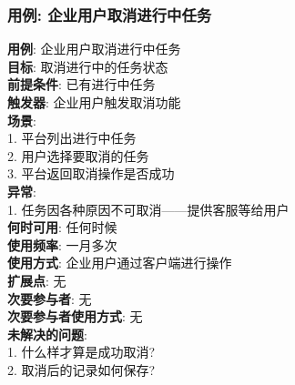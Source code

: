 \documentclass[UTF8]{article}
\begin{document}
\subsubsection{用例: 企业用户取消进行中任务}
\noindent
\textbf{用例}: 企业用户取消进行中任务
\\
\textbf{目标}: 取消进行中的任务状态
\\
\textbf{前提条件}: 已有进行中任务
\\
\textbf{触发器}: 企业用户触发取消功能
\\
\textbf{场景}: \\
	\hspace*{2em} 1. 平台列出进行中任务 \\
	\hspace*{2em} 2. 用户选择要取消的任务 \\
	\hspace*{2em} 3. 平台返回取消操作是否成功 \\
\textbf{异常}: \\
	\hspace*{2em} 1. 任务因各种原因不可取消——提供客服等给用户 \\
\textbf{何时可用}: 任何时候
\\
\textbf{使用频率}: 一月多次
\\
\textbf{使用方式}: 企业用户通过客户端进行操作 \\
\textbf{扩展点}: 无
\\
\textbf{次要参与者}: 无
\\
\textbf{次要参与者使用方式}: 无
\\
\textbf{未解决的问题}: \\
	\hspace*{2em} 1. 什么样才算是成功取消? \\
	\hspace*{2em} 2. 取消后的记录如何保存? \\
			
\end{document}
